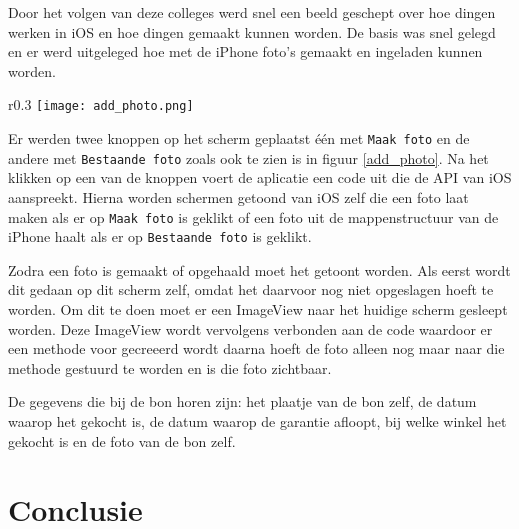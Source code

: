 \documentclass[a4paper,11pt,oneside]{report}
\begin{document}
Door het volgen van deze colleges werd snel een beeld geschept over hoe dingen
werken in iOS en hoe dingen gemaakt kunnen worden. De basis was snel gelegd en
er werd uitgeleged hoe met de iPhone foto's gemaakt en ingeladen kunnen worden.
\begin{wrapfigure}{r}{0.3\textwidth}
  \texttt{[image: add\_photo.png]}
  \caption{Toevoegen van een foto}
  \label{add_photo}
\end{wrapfigure}
Er werden twee knoppen op het scherm geplaatst \'e\'en met
\lstinline[style=code-block]|Maak foto| en de andere met
\lstinline[style=code-block]|Bestaande foto| zoals ook te zien is in
figuur \ref{add_photo}. Na het klikken op een van de knoppen voert de aplicatie
een code uit die de API van iOS aanspreekt. Hierna worden schermen getoond van
iOS zelf die een foto laat maken als er op
\lstinline[style=code-block]|Maak foto| is geklikt of een foto uit de
mappenstructuur van de iPhone haalt als er op
\lstinline[style=code-block]|Bestaande foto| is geklikt.

Zodra een foto is gemaakt of opgehaald moet het getoont worden. Als eerst wordt
dit gedaan op dit scherm zelf, omdat het daarvoor nog niet opgeslagen hoeft te
worden. Om dit te doen moet er een ImageView naar het huidige scherm gesleept
worden. Deze ImageView wordt vervolgens verbonden aan de code waardoor er een
methode voor gecreeerd wordt daarna hoeft de foto alleen nog maar naar die
methode gestuurd te worden en is die foto zichtbaar.
\newline

De gegevens die bij de bon horen zijn: het plaatje van de bon zelf, de datum
waarop het gekocht is, de datum waarop de garantie afloopt, bij welke winkel het
gekocht is en de foto van de bon zelf.













\chapter{Conclusie}




\appendix
\end{document}
